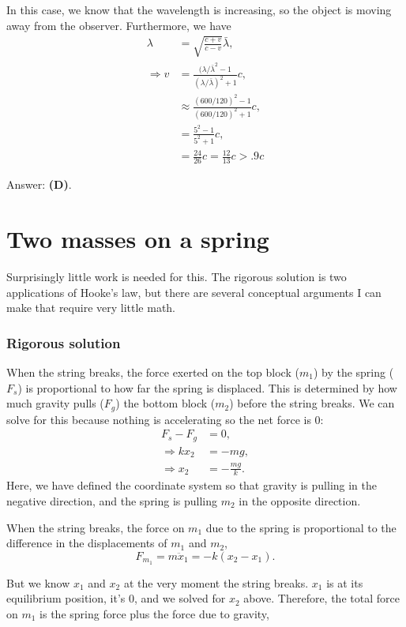 \documentclass[11pt]{paper}
\newcommand{\answer}[1]{Answer: \textbf{(#1)}.}
\begin{document}
In this case, we know that the wavelength is increasing, so the object is moving away from the observer.  Furthermore, we have
\begin{align}
\lambda &= \sqrt{\frac{c+v}{c-v}}\bar{\lambda},\\
\Rightarrow v &= \frac{(\lambda/\bar{\lambda}^2-1}{(\lambda/\bar{\lambda})^2+1}c,\\
&\approx \frac{(600/120)^2-1}{(600/120)^2+1}c,\\
&= \frac{5^2-1}{5^2+1}c,\\
&=\frac{24}{26}c = \frac{12}{13}c>.9c
\end{align}

\answer{D}

\section{Two masses on a spring}
Surprisingly little work is needed for this.  The rigorous solution is two applications of Hooke's law, but there are several conceptual arguments I can make that require very little math.
\subsubsection*{Rigorous solution}
When the string breaks, the force exerted on the top block ($m_1$) by the spring ($F_s$) is proportional to how far the spring is displaced.  This is determined by how much gravity pulls ($F_g$) the bottom block ($m_2$) before the string breaks.  We can solve for this because nothing is accelerating so the net force is 0:
\begin{align}
F_s - F_g &= 0,\\
\Rightarrow kx_2 &= -mg,\\
\Rightarrow x_2 &= -\frac{mg}{k}.
\end{align}
Here, we have defined the coordinate system so that gravity is pulling in the negative direction, and the spring is pulling $m_2$ in the opposite direction.

When the string breaks, the force on $m_1$ due to the spring is proportional to the difference in the displacements of $m_1$ and $m_2$,
\begin{equation}
F_{m_1} = m\ddot{x}_1 = -k(x_2-x_1).
\end{equation}

But we know $x_1$ and $x_2$ at the very moment the string breaks.  $x_1$ is at its equilibrium position, it's $0$, and we solved for $x_2$ above.  Therefore, the total force on $m_1$ is the spring force plus the force due to gravity,
\end{document}
